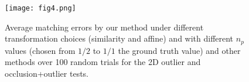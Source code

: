 \documentclass[11pt,bezier,]{article}
\begin{document}
\begin{figure}[ht]
\centering
\texttt{[image: fig4.png]}

% 
%     
\caption{
Average  matching errors by our method under different transformation choices (similarity and affine)
and with different $n_p$ values (chosen from $1/2$ to $1/1$ the ground truth value) and
other methods over 100 random trials
for the 2D outlier and occlusion+outlier tests.
\label{2D_nonrotate_sta}}
\end{figure}
\end{document}
